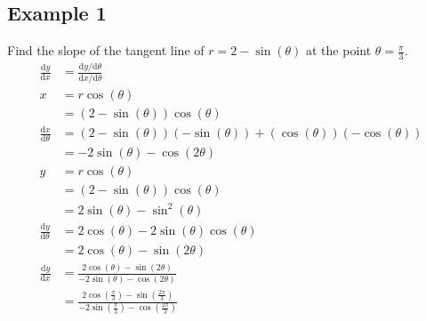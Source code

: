 \documentclass[letterpaper, 12pt]{article}
\newcommand*{\diff}{\mathrm{d}}
\begin{document}
\subsection*{Example 1}
Find the slope of the tangent line of \( r = 2-\sin(\theta) \) at the point
\( \theta = \frac{\pi}{3} \).
\begin{align*}
  \frac{\diff{y}}{\diff{x}} &=
    \frac{\diff{y}/\diff{\theta}}{\diff{x}/\diff{\theta}} \\
  x &= r\cos(\theta) \\
  &= (2-\sin(\theta))\cos(\theta) \\
  \frac{\diff{x}}{\diff{\theta}} &= (2-\sin(\theta))(-\sin(\theta))+
    (\cos(\theta))(-\cos(\theta)) \\
  &= -2\sin(\theta)-\cos(2\theta) \\
  y &= r\cos(\theta) \\
  &= (2-\sin(\theta))\cos(\theta) \\
  &= 2\sin(\theta)-\sin^{2}(\theta) \\
  \frac{\diff{y}}{\diff{\theta}} &= 2\cos(\theta)-2\sin(\theta)\cos(\theta) \\
  &= 2\cos(\theta)-\sin(2\theta) \\
  \frac{\diff{y}}{\diff{x}} &=
    \frac{2\cos(\theta)-\sin(2\theta)}{-2\sin(\theta)-\cos(2\theta)} \\
  &= \frac{2\cos(\frac{\pi}{3})-\sin(\frac{2\pi}{3})}
    {-2\sin(\frac{\pi}{3})-\cos(\frac{2\pi}{3})} \\
\end{align*}
\end{document}
